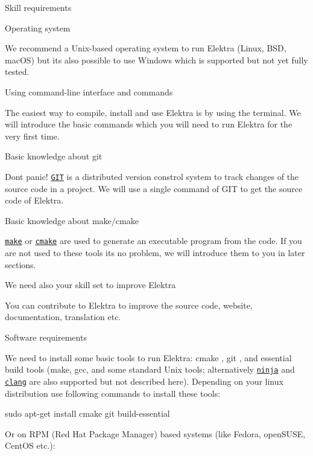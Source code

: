 
\begin{DoxyItemize}
\item Skill requirements
\begin{DoxyItemize}
\item Operating system

We recommend a Unix-\/based operating system to run Elektra (Linux, B\+SD, mac\+OS) but it\textquotesingle{}s also possible to use Windows which is supported but not yet fully tested.
\item Using command-\/line interface and commands

The easiest way to compile, install and use Elektra is by using the terminal. We will introduce the basic commands which you will need to run Elektra for the very first time.
\item Basic knowledge about git

Dont panic! \href{https://git-scm.com/}{\tt G\+IT} is a distributed version constrol system to track changes of the source code in a project. We will use a single command of G\+IT to get the source code of Elektra.
\item Basic knowledge about make/cmake

\href{https://www.gnu.org/software/make/}{\tt make} or \href{https://cmake.org/}{\tt cmake} are used to generate an executable program from the code. If you are not used to these tools its no problem, we will introduce them to you in later sections.
\item We need also your skill set to improve Elektra

You can contribute to Elektra to improve the source code, website, documentation, translation etc.
\end{DoxyItemize}
\item Software requirements

We need to install some basic tools to run Elektra\+: cmake , git , and essential build tools (make, gcc, and some standard Unix tools; alternatively \href{https://ninja-build.org/}{\tt ninja} and \href{https://clang.llvm.org/index.html}{\tt clang} are also supported but not described here). Depending on your linux distribution use following commands to install these tools\+:
\end{DoxyItemize}


\begin{DoxyCode}
sudo apt-get install cmake git build-essential
\end{DoxyCode}


Or on R\+PM (Red Hat Package Manager) based systems (like Fedora, open\+S\+U\+SE, Cent\+OS etc.)\+:



